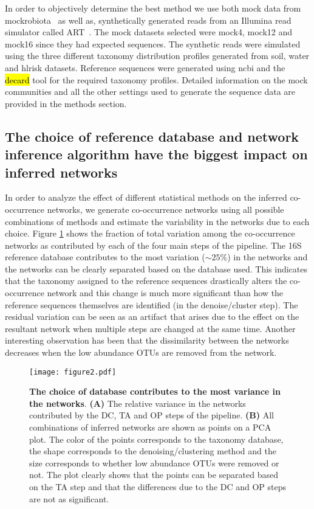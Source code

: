   In order to objectively determine the best method we use both mock data from mockrobiota~\cite{Bokulich2016} as well as, synthetically generated reads from an Illumina read simulator called ART~\cite{Huang2012}.
  The mock datasets selected were mock4, mock12 and mock16 since they had expected sequences.
  The synthetic reads were simulated using the three different taxonomy distribution profiles generated from soil, water and hl{risk} datasets.
  Reference sequences were generated using \ac{ncbi} and the \hl{decard} tool \cite{Golob2017} for the required taxonomy profiles.
  Detailed information on the mock communities and all the other settings used to generate the sequence data are provided in the methods section.


  \FloatBarrier

  \subsection*{The choice of reference database and network inference algorithm have the biggest impact on inferred networks}

  In order to analyze the effect of different statistical methods on the inferred co-occurrence networks, we generate co-occurrence networks using all possible combinations of methods and estimate the variability in the networks due to each choice.
  Figure \ref{fig:figure2} shows the fraction of total variation among the co-occurrence networks as contributed by each of the four main steps of the pipeline.
  The 16S reference database contributes to the most variation ($\sim25\%$) in the networks and the networks can be clearly separated based on the database used.
  This indicates that the taxonomy assigned to the reference sequences drastically alters the co-occurrence network and this change is much more significant than how the reference sequences themselves are identified (in the denoise/cluster step).
  The residual variation can be seen as an artifact that arises due to the effect on the resultant network when multiple steps are changed at the same time.
  Another interesting observation has been that the dissimilarity between the networks decreases when the low abundance OTUs are removed from the network.

  \begin{figure}
    \centering
    \texttt{[image: figure2.pdf]}
    \caption{
      \textbf{The choice of database contributes to the most variance in the networks}.
      \textbf{(A)} The relative variance in the networks contributed by the DC, TA and OP steps of the pipeline.
      \textbf{(B)} All combinations of inferred networks are shown as points on a PCA plot. The color of the points corresponds to the taxonomy database, the shape corresponds to the denoising/clustering method and the size corresponds to whether low abundance OTUs were removed or not.
      The plot clearly shows that the points can be separated based on the TA step and that the differences due to the DC and OP steps are not as significant.
    }
    \label{fig:figure2}
  \end{figure}

